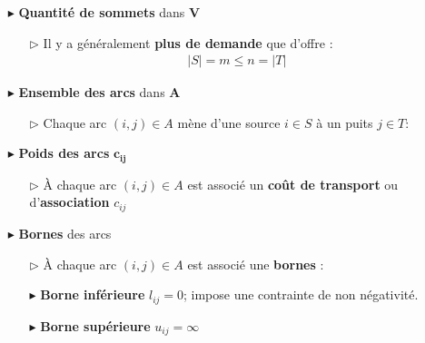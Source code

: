 \documentclass{report}
\begin{document}
\begin{multicols*}{2}
\begin{itemize}
    \item [$\blacktriangleright$ ] \textbf{Quantité de sommets} dans $\boldsymbol{V}$  
        \begin{itemize}
            \item [$\rhd$ ] 
                Il y a généralement \textbf{plus de demande} que d'offre :
                \begin{align*}
                    |S|  = m \leq n = |T|
                \end{align*}
        \end{itemize}
    \item [$\blacktriangleright$ ] \textbf{Ensemble des arcs} dans $\boldsymbol{A}$  
        \begin{itemize}
            \item [$\rhd$ ] 
                Chaque arc $(i, j) \in A$ mène d'une source 
                $i \in S$ à un puits $j \in T$:
        \end{itemize}
    \item [$\blacktriangleright$ ] \textbf{Poids des arcs} $\boldsymbol{c_{ij}}$  
        \begin{itemize}
            \item [$\rhd$ ] 
                À chaque arc $(i, j) \in A$ est associé un 
                \textbf{coût de transport} ou d'\textbf{association }
                $c_{ij}$  
        \end{itemize}
    \item [$\blacktriangleright$ ] \textbf{Bornes} des arcs 
        \begin{itemize}
            \item [$\rhd$ ] 
                À chaque arc $(i, j) \in A$ est associé une 
                \textbf{bornes} : 
            \item [$\blacktriangleright$ ] \textbf{Borne inférieure} 
                $l_{ij} = 0$; impose une contrainte de non négativité.
            \item [$\blacktriangleright$ ] \textbf{Borne supérieure} 
                $u_{ij} = \infty$
        \end{itemize}
\end{itemize}                           

\end{multicols*}
\end{document}
